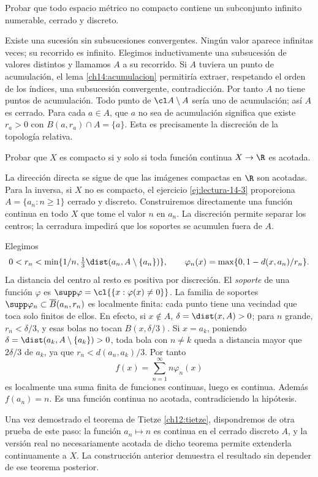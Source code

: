 \begin{ejercicio}\label{ej:lectura-14-3}
Probar que todo espacio métrico no compacto contiene un subconjunto infinito numerable, cerrado y discreto.
\end{ejercicio}
\begin{solucion}
Existe una sucesión sin subsucesiones convergentes. Ningún valor aparece infinitas veces; su recorrido es infinito. Elegimos inductivamente una subsucesión de valores distintos y llamamos $A$ a su recorrido. Si $A$ tuviera un punto de acumulación, el lema \ref{ch14:acumulacion} permitiría extraer, respetando el orden de los índices, una subsucesión convergente, contradicción. Por tanto $A$ no tiene puntos de acumulación. Todo punto de $\cl A\setminus A$ sería uno de acumulación; así $A$ es cerrado. Para cada $a\in A$, que $a$ no sea de acumulación significa que existe $r_a>0$ con $B(a,r_a)\cap A=\{a\}$. Esta es precisamente la discreción de la topología relativa.
\end{solucion}

\begin{ejercicio}\label{ej:lectura-14-4}
Probar que $X$ es compacto si y solo si toda función continua $X\to\R$ es acotada.
\end{ejercicio}
\begin{solucion}
La dirección directa se sigue de que las imágenes compactas en $\R$ son acotadas. Para la inversa, si $X$ no es compacto, el ejercicio \ref{ej:lectura-14-3} proporciona $A=\{a_n:n\ge1\}$ cerrado y discreto. Construiremos directamente una función continua en todo $X$ que tome el valor $n$ en $a_n$. La discreción permite separar los centros; la cerradura impedirá que los soportes se acumulen fuera de $A$.

Elegimos
\[
0<r_n<\min\{1/n,\tfrac13\dist(a_n,A\setminus\{a_n\})\},\qquad
\varphi_n(x)=\max\{0,1-d(x,a_n)/r_n\}.
\]
La distancia del centro al resto es positiva por discreción. El \emph{soporte} de una función $\varphi$ es $\supp\varphi=\cl{\{x:\varphi(x)\ne0\}}$. La familia de soportes $\supp\varphi_n\subset\overline B(a_n,r_n)$ es localmente finita: cada punto tiene una vecindad que toca solo finitos de ellos. En efecto, si $x\notin A$, $\delta=\dist(x,A)>0$; para $n$ grande, $r_n<\delta/3$, y esas bolas no tocan $B(x,\delta/3)$. Si $x=a_k$, poniendo $\delta=\dist(a_k,A\setminus\{a_k\})>0$, toda bola con $n\ne k$ queda a distancia mayor que $2\delta/3$ de $a_k$, ya que $r_n<d(a_n,a_k)/3$. Por tanto
\[
f(x)=\sum_{n=1}^\infty n\varphi_n(x)
\]
es localmente una suma finita de funciones continuas, luego es continua. Además $f(a_n)=n$. Es una función continua no acotada, contradiciendo la hipótesis.

Una vez demostrado el teorema de Tietze \ref{ch12:tietze}, dispondremos de otra prueba de este paso: la función $a_n\mapsto n$ es continua en el cerrado discreto $A$, y la versión real no necesariamente acotada de dicho teorema permite extenderla continuamente a $X$. La construcción anterior demuestra el resultado sin depender de ese teorema posterior.
\end{solucion}

